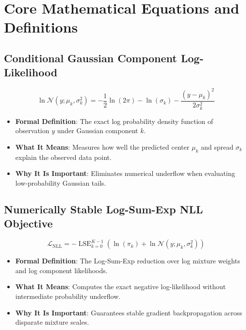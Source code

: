 \documentclass[11pt,a4paper]{article}
\theoremstyle{definition}
\begin{document}
\section{Core Mathematical Equations and Definitions}

\subsection{Conditional Gaussian Component Log-Likelihood}
{\boldmath
\begin{equation}
\ln \mathcal{N}(y; \mu_k, \sigma_k^2) = - \frac{1}{2}\ln(2\pi) - \ln(\sigma_k) - \frac{(y - \mu_k)^2}{2\sigma_k^2}
\end{equation}
}
\begin{itemize}
    \item \textbf{Formal Definition}: The exact log probability density function of observation $y$ under Gaussian component $k$.
    \item \textbf{What It Means}: Measures how well the predicted center $\mu_k$ and spread $\sigma_k$ explain the observed data point.
    \item \textbf{Why It Is Important}: Eliminates numerical underflow when evaluating low-probability Gaussian tails.
\end{itemize}

\subsection{Numerically Stable Log-Sum-Exp NLL Objective}
{\boldmath
\begin{equation}
\mathcal{L}_{\text{NLL}} = - \operatorname{LSE}_{k=0}^{K-1} \left( \ln(\pi_k) + \ln \mathcal{N}(y; \mu_k, \sigma_k^2) \right)
\end{equation}
}
\begin{itemize}
    \item \textbf{Formal Definition}: The Log-Sum-Exp reduction over log mixture weights and log component likelihoods.
    \item \textbf{What It Means}: Computes the exact negative log-likelihood without intermediate probability underflow.
    \item \textbf{Why It Is Important}: Guarantees stable gradient backpropagation across disparate mixture scales.
\end{itemize}
\end{document}
